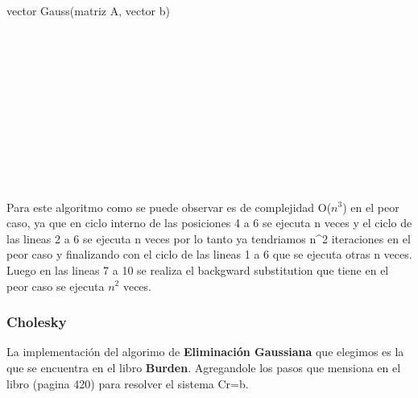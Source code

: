 \begin{algorithm}
    \begin{algorithmic}[1]\parskip=1mm
        \caption{vector Gauss(matriz A, vector b)}
        \\
        \\
        \\
        \\
        \\
        \\
        \\
        \\
        \\
        \\
    \end{algorithmic}
\end{algorithm}

Para este algoritmo como se puede observar es de complejidad O($n^3$) en el peor caso, ya que en ciclo interno de las posiciones 4 a 6 se ejecuta n veces y el ciclo de las lineas 2 a 6 se ejecuta n veces por lo tanto ya tendriamos n^2 iteraciones en el peor caso y finalizando con el ciclo de las lineas 1 a 6 que se ejecuta otras n veces.
Luego en las lineas 7 a 10 se realiza el backgward substitution  que tiene en el peor caso se ejecuta $n^2$ veces.

\subsubsection{Cholesky}

La implementación del algorimo de \textbf{Eliminación Gaussiana} que elegimos es la que se encuentra en el libro \textbf{Burden}.
Agregandole los pasos que mensiona en el libro (pagina 420) para resolver el sistema Cr=b.

